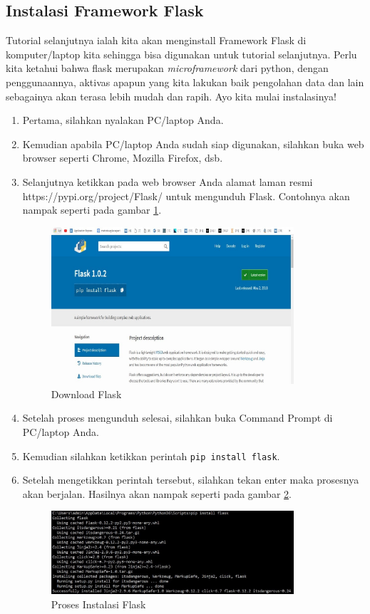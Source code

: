 \subsection{Instalasi Framework Flask}
Tutorial selanjutnya ialah kita akan menginstall Framework Flask di komputer/laptop kita sehingga bisa digunakan untuk tutorial selanjutnya. Perlu kita ketahui bahwa flask merupakan \textit{microframework} dari python, dengan penggunaannya, aktivas apapun yang kita lakukan baik pengolahan data dan lain sebagainya akan terasa lebih mudah dan rapih. Ayo kita mulai instalasinya!
\begin{enumerate}
\item Pertama, silahkan nyalakan PC/laptop Anda.
\item Kemudian apabila PC/laptop Anda sudah siap digunakan, silahkan buka web browser seperti Chrome, Mozilla Firefox, dsb.
\item Selanjutnya ketikkan pada web browser Anda alamat laman resmi https://pypi.org/project/Flask/ untuk mengunduh Flask. Contohnya akan nampak seperti pada gambar \ref{fig:download_flask}.
\begin{figure}[!htbp]
	\centerline{\includegraphics[width=0.85\textwidth]{figures/8/download_flask.jpg}}
	\caption{Download Flask}
	\label{fig:download_flask}
\end{figure}
 
\item Setelah  proses mengunduh selesai, silahkan buka Command Prompt di PC/laptop Anda.
\item Kemudian silahkan ketikkan perintah \verb|pip install flask|.
\item Setelah mengetikkan perintah tersebut, silahkan tekan enter maka prosesnya akan berjalan. Hasilnya akan nampak seperti pada gambar \ref{fig:install_flask}.
\begin{figure}[!htbp]
	\centerline{\includegraphics[width=0.85\textwidth]{figures/8/install_flask.jpg}}
	\caption{Proses Instalasi Flask}
	\label{fig:install_flask}
\end{figure}
 

\end{enumerate}
